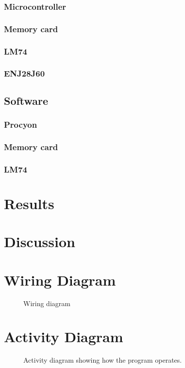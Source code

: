 \documentclass[a4paper,twoside,titlepage]{article}
\begin{document}
		\subsubsection{Microcontroller}
		\subsubsection{Memory card}
		\subsubsection{LM74}
		\subsubsection{ENJ28J60}
	\subsection{Software}
		\subsubsection{Procyon}
		\subsubsection{Memory card}
		\subsubsection{LM74}

\section{Results}

\section{Discussion}

%  
%  

    \clearpage
    \appendix
	\section{Wiring Diagram}\label{wiring-diagram}
	\begin{figure}[!htp]
        \centering
        \caption{Wiring diagram}
        \label{fig:wiring-diagram}
    \end{figure}

	\section{Activity Diagram}\label{activity-diagram}
	\begin{figure}[!htp]
        \centering
        \caption{Activity diagram showing how the program operates.}
        \label{fig:activity-diagram}
    \end{figure}
\end{document}
